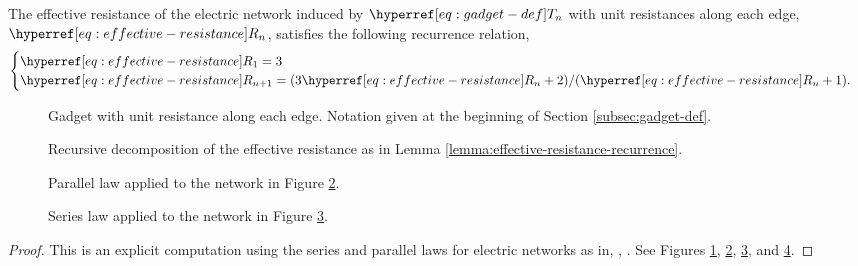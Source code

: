\documentclass[12pt]{amsart}
\numberwithin{equation}{section}
\begin{document}
	\begin{lemma} \label{lemma:effective-resistance-recurrence}
		The effective resistance of the electric network induced by $\Tn{n}$ with unit 
		resistances along each edge, $\Rn{n}$, satisfies the following recurrence relation, 
		\begin{equation} \label{eq:effective-resistance-recurrence}
			\begin{cases}
				\Rn{1} = 3 \\
				\Rn{n+1} = (3 \Rn{n} + 2)/(\Rn{n} + 1).
			\end{cases}
		\end{equation}
	\end{lemma}
	\begin{figure}
		\begin{center}
			  
		\end{center} \caption{Gadget with unit resistance along each edge. Notation given at the beginning of Section \ref{subsec:gadget-def}. }\label{fig:elec1}
	\end{figure}
	\begin{figure}
		\begin{center}
			  
		\end{center}
		\caption{Recursive decomposition of the effective resistance as in Lemma \ref{lemma:effective-resistance-recurrence}.} \label{fig:elec2}
	\end{figure}
	\begin{figure}
		\begin{center}
			  
		\end{center}
		\caption{Parallel law applied to the network in Figure \ref{fig:elec2}.}\label{fig:elec3}
	\end{figure}
	\begin{figure}
		\begin{center}
			  
		\end{center}
		\caption{Series law applied to the network in Figure \ref{fig:elec3}.}\label{fig:elec4}
	\end{figure}
	
	
	
	\begin{proof}
		This is an explicit computation using the series and parallel laws for electric networks as in, \eg, \cite[Section 2.3]{lyons-peres-book}. See Figures \ref{fig:elec1}, \ref{fig:elec2}, \ref{fig:elec3}, and \ref{fig:elec4}.
	\end{proof}
	
\end{document}
